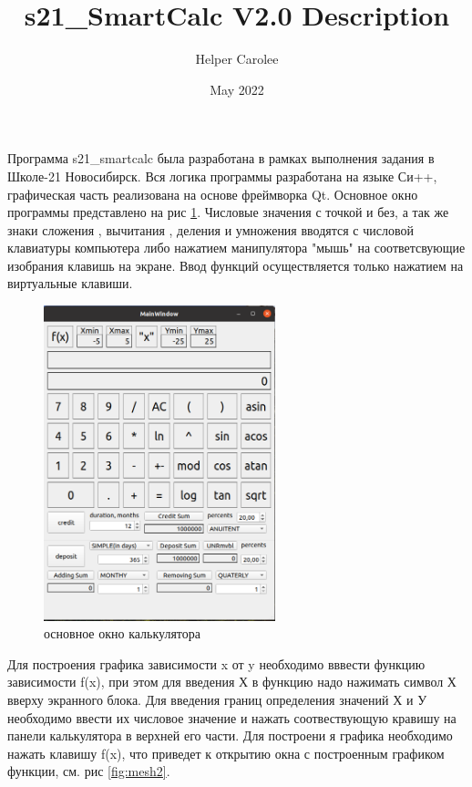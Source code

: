 \documentclass[10pt, letterpaper, final]{article}
\begin{document}
\title{s21\_SmartCalc V2.0 Description}
\author{Helper Carolee}
\date{May 2022}
\maketitle
{}
  Программа s21\_smartcalc была разработана в рамках выполнения задания в Школе-21 Новосибирск. 
Вся логика программы разработана на языке Си++, графическая часть реализована на основе фреймворка Qt.
Основное окно программы представлено на рис \ref{fig:mesh1}.
Числовые значения с точкой и без, а так же знаки сложения , вычитания , деления  и умножения вводятся с числовой клавиатуры компьютера либо нажатием манипулятора "мышь" на соответсвующие изобрания клавишь на экране.
Ввод функций осуществляется только нажатием на виртуальные клавиши.
\begin{figure}[H]
   \centering
   \includegraphics[width=0.6\textwidth]{base-window.png}
   \caption{основное окно калькулятора}
   \label{fig:mesh1}
\end{figure}

Для построения графика зависимости x от y необходимо вввести функцию зависимости f(x), при этом для введения Х в функцию надо нажимать символ Х вверху экранного блока. Для введения границ определения значений Х и У необходимо ввести их числовое значение и нажать соотвествующую кравишу на панели калькулятора в верхней его части. Для построени я графика необходимо нажать клавишу f(x), что приведет к открытию окна с построенным графиком функции, см. рис \ref{fig:mesh2}.
\end{document}
